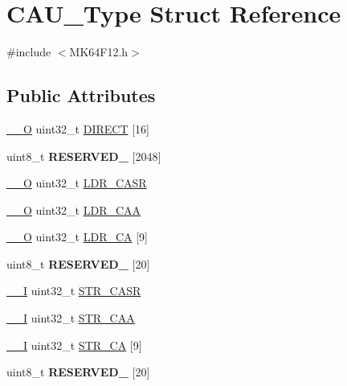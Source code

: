 \hypertarget{structCAU__Type}{}\section{C\+A\+U\+\_\+\+Type Struct Reference}
\label{structCAU__Type}


{\ttfamily \#include $<$M\+K64\+F12.\+h$>$}

\subsection*{Public Attributes}
\begin{DoxyCompactItemize}
\item 
\hyperlink{core__sc300_8h_a7e25d9380f9ef903923964322e71f2f6}{\+\_\+\+\_\+O} uint32\+\_\+t \hyperlink{structCAU__Type_ad414a622f9732f77f9ca2ebb787c842c}{D\+I\+R\+E\+CT} \mbox{[}16\mbox{]}
\item 
uint8\+\_\+t {\bfseries R\+E\+S\+E\+R\+V\+E\+D\+\_} \mbox{[}2048\mbox{]}\hypertarget{structCAU__Type_a000c951ca930029842ac48a3932d1bb0}{}\label{structCAU__Type_a000c951ca930029842ac48a3932d1bb0}

\item 
\hyperlink{core__sc300_8h_a7e25d9380f9ef903923964322e71f2f6}{\+\_\+\+\_\+O} uint32\+\_\+t \hyperlink{structCAU__Type_ad80730fc61ca2c55b4f30b0b96f8f497}{L\+D\+R\+\_\+\+C\+A\+SR}
\item 
\hyperlink{core__sc300_8h_a7e25d9380f9ef903923964322e71f2f6}{\+\_\+\+\_\+O} uint32\+\_\+t \hyperlink{structCAU__Type_a4ed721a08f4487b46525e8014880e48a}{L\+D\+R\+\_\+\+C\+AA}
\item 
\hyperlink{core__sc300_8h_a7e25d9380f9ef903923964322e71f2f6}{\+\_\+\+\_\+O} uint32\+\_\+t \hyperlink{structCAU__Type_a505ec0918825dd09570bb7fd6ab53df4}{L\+D\+R\+\_\+\+CA} \mbox{[}9\mbox{]}
\item 
uint8\+\_\+t {\bfseries R\+E\+S\+E\+R\+V\+E\+D\+\_} \mbox{[}20\mbox{]}\hypertarget{structCAU__Type_adaa2663eebd61ddd645cb18ccb7ec8dc}{}\label{structCAU__Type_adaa2663eebd61ddd645cb18ccb7ec8dc}

\item 
\hyperlink{core__sc300_8h_af63697ed9952cc71e1225efe205f6cd3}{\+\_\+\+\_\+I} uint32\+\_\+t \hyperlink{structCAU__Type_a475b305a546c5aaae9a05fd9cb448815}{S\+T\+R\+\_\+\+C\+A\+SR}
\item 
\hyperlink{core__sc300_8h_af63697ed9952cc71e1225efe205f6cd3}{\+\_\+\+\_\+I} uint32\+\_\+t \hyperlink{structCAU__Type_a72320359f6a82e0083f25af7bdb09659}{S\+T\+R\+\_\+\+C\+AA}
\item 
\hyperlink{core__sc300_8h_af63697ed9952cc71e1225efe205f6cd3}{\+\_\+\+\_\+I} uint32\+\_\+t \hyperlink{structCAU__Type_a267a36493b82b59a769d9b7bcad8584c}{S\+T\+R\+\_\+\+CA} \mbox{[}9\mbox{]}
\item 
uint8\+\_\+t {\bfseries R\+E\+S\+E\+R\+V\+E\+D\+\_} \mbox{[}20\mbox{]}\hypertarget{structCAU__Type_af8271b0259735193b0682c8ed14f54d5}{}\label{structCAU__Type_af8271b0259735193b0682c8ed14f54d5}


\end{DoxyCompactItemize}
